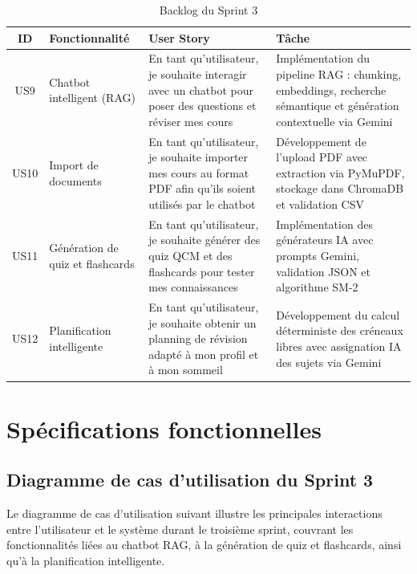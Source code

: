 \begin{table}[H]
\centering
\renewcommand{\arraystretch}{1.3}
\begin{tabular}{|c|p{3cm}|p{6cm}|p{4cm}|}
\hline
\textbf{ID} & \textbf{Fonctionnalité} & \textbf{User Story} & \textbf{Tâche} \\
\hline

US9 & Chatbot intelligent (RAG)
& En tant qu'utilisateur, je souhaite interagir avec un chatbot pour poser des questions et réviser mes cours
& Implémentation du pipeline RAG : chunking, embeddings, recherche sémantique et génération contextuelle via Gemini \\ \hline

US10 & Import de documents
& En tant qu'utilisateur, je souhaite importer mes cours au format PDF afin qu'ils soient utilisés par le chatbot
& Développement de l'upload PDF avec extraction via PyMuPDF, stockage dans ChromaDB et validation CSV \\ \hline

US11 & Génération de quiz et flashcards
& En tant qu'utilisateur, je souhaite générer des quiz QCM et des flashcards pour tester mes connaissances
& Implémentation des générateurs IA avec prompts Gemini, validation JSON et algorithme SM-2 \\ \hline

US12 & Planification intelligente
& En tant qu'utilisateur, je souhaite obtenir un planning de révision adapté à mon profil et à mon sommeil
& Développement du calcul déterministe des créneaux libres avec assignation IA des sujets via Gemini \\ \hline

\end{tabular}
\caption{Backlog du Sprint 3}
\label{tab:backlogs3}
\end{table}



\section{Spécifications fonctionnelles}

\subsection{Diagramme de cas d'utilisation du Sprint 3}

Le diagramme de cas d'utilisation suivant illustre les principales interactions entre l'utilisateur et le système durant le troisième sprint, couvrant les fonctionnalités liées au chatbot RAG, à la génération de quiz et flashcards, ainsi qu'à la planification intelligente.

